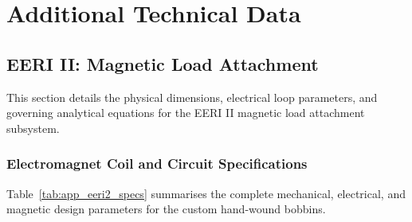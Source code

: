 \chapter{Additional Technical Data}
\label{app:technical}

\section{EERI II: Magnetic Load Attachment}
\label{sec:app-eeri2-technical}
This section details the physical dimensions, electrical loop parameters, and governing analytical equations for the EERI II magnetic load attachment subsystem.

\subsection{Electromagnet Coil and Circuit Specifications}
Table~\ref{tab:app_eeri2_specs} summarises the complete mechanical, electrical, and magnetic design parameters for the custom hand-wound bobbins.

